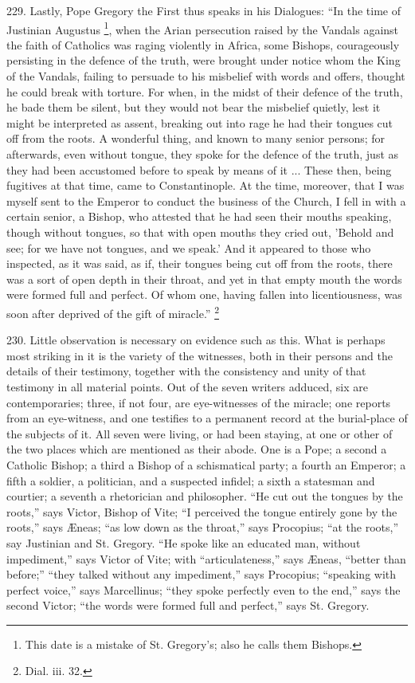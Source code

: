 229.
Lastly, Pope Gregory the First thus speaks in his Dialogues: ``In the
time of Justinian Augustus \footnote{This date is a mistake of St. Gregory's; also he calls them Bishops.},
when the Arian persecution raised by the Vandals against the faith of
Catholics was raging violently in Africa, some Bishops, courageously
persisting in the defence of the truth, were brought under notice whom
the King of the Vandals, failing to persuade to his misbelief with
words and offers, thought he could break with torture. For when, in
the midst of their defence of the truth, he bade them be silent, but
they would not bear the misbelief quietly, lest it might be
interpreted as assent, breaking out into rage he had their tongues cut
off from the roots. A wonderful thing, and known to many senior
persons; for afterwards, even without tongue, they spoke for the
defence of the truth, just as they had been accustomed before to
speak by means of it ... These then, being fugitives at that time,
came to Constantinople. At the time, moreover, that I was myself sent
to the Emperor to conduct the business of the Church, I fell in with a
certain senior, a Bishop, who attested that he had seen their mouths
speaking, though without tongues, so that with open mouths they cried
out, 'Behold and see; for we have not tongues, and we speak.' And it
appeared to those who inspected, as it was said, as if, their tongues
being cut off from the roots, there was a sort of open depth in their
throat, and yet in that empty mouth the words were formed full and
perfect. Of whom one, having fallen into licentiousness, was soon
after deprived of the gift of miracle.'' \footnote{Dial. iii. 32.}

230.
Little observation is necessary on evidence such as this. What is
perhaps most striking in it is the variety of the witnesses, both in
their persons and the details of their testimony, together with the
consistency and unity of that testimony in all material points. Out of
the seven writers adduced, six are contemporaries; three, if not four,
are eye-witnesses of the miracle; one reports from an eye-witness, and
one testifies to a permanent record at the burial-place of the
subjects of it. All seven were living, or had been staying, at one or
other of the two places which are mentioned as their abode. One is a
Pope; a second a Catholic Bishop; a third a Bishop of a
schismatical party; a fourth an Emperor; a fifth a soldier, a
politician, and a suspected infidel; a sixth a statesman and courtier;
a seventh a rhetorician and philosopher. ``He cut out the tongues by
the roots,'' says Victor, Bishop of Vite; ``I perceived the tongue
entirely gone by the roots,'' says Æneas; ``as low down as the throat,''
says Procopius; ``at the roots,'' say Justinian and St. Gregory. ``He
spoke like an educated man, without impediment,'' says Victor of Vite;
with ``articulateness,'' says Æneas, ``better than before;'' ``they talked
without any impediment,'' says Procopius; ``speaking with perfect voice,''
says Marcellinus; ``they spoke perfectly even to the end,'' says the
second Victor; ``the words were formed full and perfect,'' says St.
Gregory.

